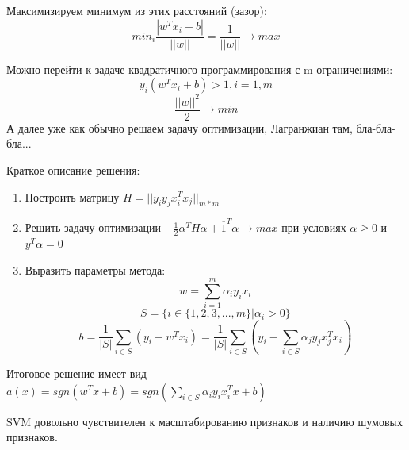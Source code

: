 Максимизируем минимум из этих расстояний (зазор):
\begin{equation}
min_i\frac{|w^Tx_i + b|}{||w||} = \frac{1}{||w||} \rightarrow max
\end{equation}

Можно перейти к задаче квадратичного программирования с m ограничениями:
\begin{equation}
y_i(w^Tx_i + b) > 1, i=\overline{1,m}
\end{equation}
\begin{equation}
\frac{||w||^2}{2} \rightarrow min
\end{equation}
А далее уже как обычно решаем задачу оптимизации, Лагранжиан там, бла-бла-бла...

Краткое описание решения:
\begin{enumerate}
    \item Построить матрицу $H = || y_iy_jx_i^Tx_j ||_{m * m}$
    \item Решить задачу оптимизации $-\frac{1}{2}\alpha^TH\alpha + \overline{1}^T\alpha \rightarrow max$ при условиях $\alpha \geq 0$ и $y^T\alpha = 0$
    \item Выразить параметры метода:
    \begin{equation}
    w = \sum\limits_{i=1}^m \alpha_iy_ix_i
    \end{equation}
    \begin{equation}
    S = \{i \in \{1,2,3,...,m\} | \alpha_i > 0\}
    \end{equation}
    \begin{equation}
    b = \frac{1}{|S|}\sum\limits_{i \in S} (y_i - w^Tx_i) = \frac{1}{|S|}\sum\limits_{i \in S} (y_i - \sum\limits_{i \in S}\alpha_j y_jx_j^Tx_i)
    \end{equation}
\end{enumerate}

Итоговое решение имеет вид $a(x) = sgn(w^Tx + b) = sgn(\sum\limits_{i \in S} \alpha_i y_ix_i^Tx + b)$

SVM довольно чувствителен к масштабированию признаков и наличию шумовых признаков.
